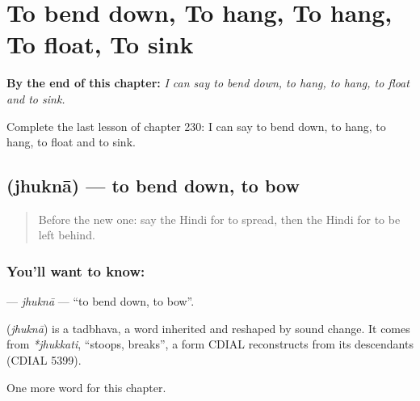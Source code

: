 
\chapter{To bend down, To hang, To hang, To float, To sink}
\label{ch:hi-to-bend-down-to-hang-to-hang-to-float-to-sink}

\begin{chapteropening}
\textbf{By the end of this chapter:} \emph{I can say to bend down, to hang, to hang, to float and to sink.}

Complete the last lesson of chapter 230: I can say to bend down, to hang, to hang, to float and to sink.
\end{chapteropening}

\section[\texorpdfstring{\hi{झुकना} (jhuknā)}{झुकना (jhuknā)}]{ (jhuknā) — to bend down, to bow}

\label{lesson:HI-C230-jhukna}



\begin{quote}
Before the new one: say the Hindi for to spread, then the Hindi for to be left behind.
\end{quote}

\subsection*{You'll want to know: }
\textbf{} — \emph{jhuknā} — \textquotedblleft{}to bend down, to bow\textquotedblright{}.

\begin{cousinweb}
\textbf{} (\emph{jhuknā}) is a tadbhava, a word inherited and reshaped by sound change. It comes from \emph{*jhukkati}, \textquotedblleft{}stoops, breaks\textquotedblright{}, a form CDIAL reconstructs from its descendants (CDIAL 5399).
\end{cousinweb}

\begin{grammarlens}[title={What you've built}]
One more word for this chapter.
\end{grammarlens}

